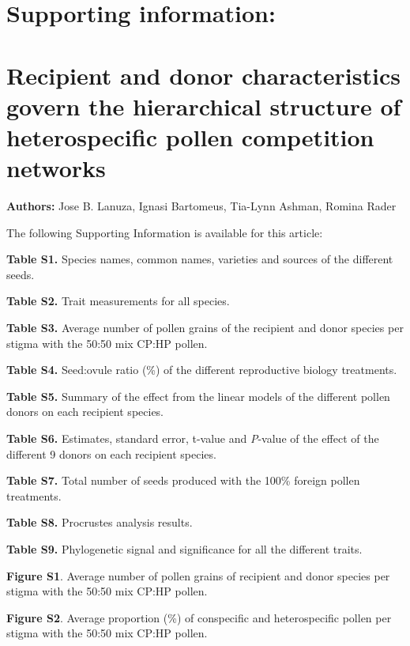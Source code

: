 \documentclass[12pt,]{article}
\author{}
\date{\vspace{-2.5em}}
\begin{document}
\captionsetup[figure]{labelformat=empty}
\captionsetup[table]{labelformat=empty} \renewcommand{\figurename}{}

\section{Supporting information:}\label{supporting-information}

\section{Recipient and donor characteristics govern the hierarchical
structure of heterospecific pollen competition
networks}\label{recipient-and-donor-characteristics-govern-the-hierarchical-structure-of-heterospecific-pollen-competition-networks}

\textbf{Authors:} Jose B. Lanuza, Ignasi Bartomeus, Tia-Lynn Ashman,
Romina Rader

The following Supporting Information is available for this article:

\textbf{Table S1.} Species names, common names, varieties and sources of
the different seeds.

\textbf{Table S2.} Trait measurements for all species.

\textbf{Table S3.} Average number of pollen grains of the recipient and
donor species per stigma with the 50:50 mix CP:HP pollen.

\textbf{Table S4.} Seed:ovule ratio (\%) of the different reproductive
biology treatments.

\textbf{Table S5.} Summary of the effect from the linear models of the
different pollen donors on each recipient species.

\textbf{Table S6.} Estimates, standard error, t-value and \emph{P}-value
of the effect of the different 9 donors on each recipient species.

\textbf{Table S7.} Total number of seeds produced with the 100\% foreign
pollen treatments.

\textbf{Table S8.} Procrustes analysis results.

\textbf{Table S9.} Phylogenetic signal and significance for all the
different traits.

\textbf{Figure S1}. Average number of pollen grains of recipient and
donor species per stigma with the 50:50 mix CP:HP pollen.

\textbf{Figure S2}. Average proportion (\%) of conspecific and
heterospecific pollen per stigma with the 50:50 mix CP:HP pollen.
\end{document}
